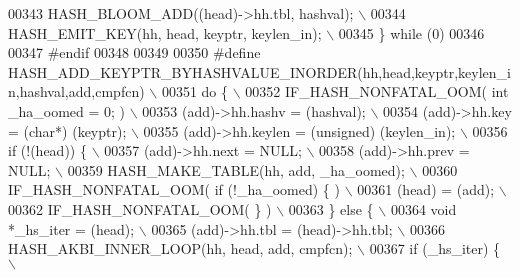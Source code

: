 \begin{DoxyCode}
{{{00343 \textcolor{preprocessor}{  HASH\_BLOOM\_ADD((head)->hh.tbl, hashval);                                       \(\backslash\)}
00344 \textcolor{preprocessor}{  HASH\_EMIT\_KEY(hh, head, keyptr, keylen\_in);                                    \(\backslash\)}
00345 \textcolor{preprocessor}{\} while (0)}
00346 
00347 \textcolor{preprocessor}{#endif}
00348 
00349 
00350 \textcolor{preprocessor}{#define HASH\_ADD\_KEYPTR\_BYHASHVALUE\_INORDER(hh,head,keyptr,keylen\_in,hashval,add,cmpfcn) \(\backslash\)}
00351 \textcolor{preprocessor}{do \{                                                                             \(\backslash\)}
00352 \textcolor{preprocessor}{  IF\_HASH\_NONFATAL\_OOM( int \_ha\_oomed = 0; )                                     \(\backslash\)}
00353 \textcolor{preprocessor}{  (add)->hh.hashv = (hashval);                                                   \(\backslash\)}
00354 \textcolor{preprocessor}{  (add)->hh.key = (char*) (keyptr);                                              \(\backslash\)}
00355 \textcolor{preprocessor}{  (add)->hh.keylen = (unsigned) (keylen\_in);                                     \(\backslash\)}
00356 \textcolor{preprocessor}{  if (!(head)) \{                                                                 \(\backslash\)}
00357 \textcolor{preprocessor}{    (add)->hh.next = NULL;                                                       \(\backslash\)}
00358 \textcolor{preprocessor}{    (add)->hh.prev = NULL;                                                       \(\backslash\)}
00359 \textcolor{preprocessor}{    HASH\_MAKE\_TABLE(hh, add, \_ha\_oomed);                                         \(\backslash\)}
00360 \textcolor{preprocessor}{    IF\_HASH\_NONFATAL\_OOM( if (!\_ha\_oomed) \{ )                                    \(\backslash\)}
00361 \textcolor{preprocessor}{      (head) = (add);                                                            \(\backslash\)}
00362 \textcolor{preprocessor}{    IF\_HASH\_NONFATAL\_OOM( \} )                                                    \(\backslash\)}
00363 \textcolor{preprocessor}{  \} else \{                                                                       \(\backslash\)}
00364 \textcolor{preprocessor}{    void *\_hs\_iter = (head);                                                     \(\backslash\)}
00365 \textcolor{preprocessor}{    (add)->hh.tbl = (head)->hh.tbl;                                              \(\backslash\)}
00366 \textcolor{preprocessor}{    HASH\_AKBI\_INNER\_LOOP(hh, head, add, cmpfcn);                                 \(\backslash\)}
00367 \textcolor{preprocessor}{    if (\_hs\_iter) \{                                                              \(\backslash\)}
}}}
\end{DoxyCode}
